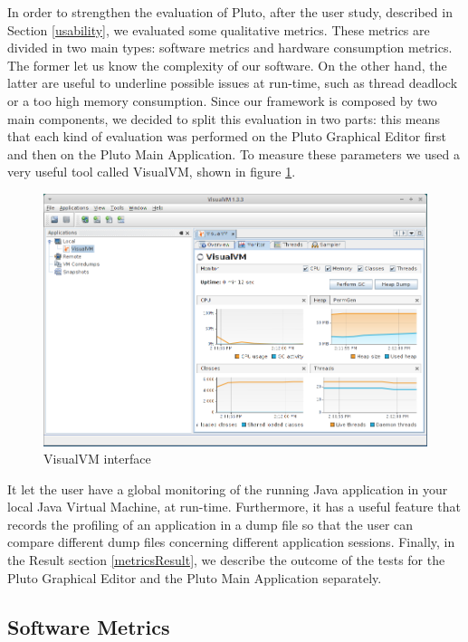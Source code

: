 In order to strengthen the evaluation of Pluto, after the user study, described in Section \ref{usability}, we evaluated some qualitative metrics. These metrics are divided in two main types: software metrics and hardware consumption metrics. The former let us know the complexity of our software.
On the other hand, the latter are useful to underline possible issues at run-time, such as thread deadlock or a too high memory consumption.
Since our framework is composed by two main components, we decided to split this evaluation in two parts: this means that each kind of evaluation was performed on the Pluto Graphical Editor first and then on the Pluto Main Application.
To measure these parameters we used a very useful tool called VisualVM, shown in figure \ref{fig:visualVM}. 

\begin{figure}[H]
  \centering
  \includegraphics[width=\linewidth]{pictures/visualVM.png}
  \caption{VisualVM interface}
  \label{fig:visualVM}
\end{figure}

It let the user have a global monitoring of the running Java application in your local Java Virtual Machine, at run-time. Furthermore, it has a useful feature that records the profiling of an application in a dump file so that the user can compare different dump files concerning different application sessions.
Finally, in the Result section \ref{metricsResult}, we describe the outcome of the tests for the Pluto Graphical Editor and the Pluto Main Application separately.

\subsection{Software Metrics}

